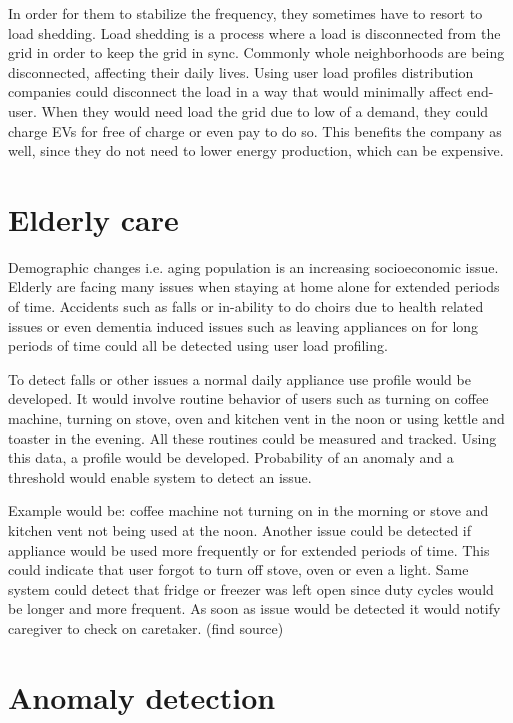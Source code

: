 \documentclass[
11pt, %
english, %
singlespacing, %
headsepline, %
]{MastersDoctoralThesis} %
\begin{document}
In order for them to stabilize the frequency, they sometimes have to resort to load shedding.
Load shedding is a process where a load is disconnected from the grid in order to keep the grid in sync.
Commonly whole neighborhoods are being disconnected, affecting their daily lives.
Using user load profiles distribution companies could disconnect the load in a way that would minimally affect end-user. 
When they would need load the grid due to low of a demand, they could charge EVs for free of charge or even pay to do so. 
This benefits the company as well, since they do not need to lower energy production, which can be expensive. 

\section{Elderly care}

Demographic changes i.e. aging population is an increasing socioeconomic issue.
Elderly are facing many issues when staying at home alone for extended periods of time.
Accidents such as falls or in-ability to do choirs due to health related issues or even dementia induced issues 
such as leaving appliances on for long periods of time could all be detected using user load profiling.

To detect falls or other issues a normal daily appliance use profile would be developed.
It would involve routine behavior of users such as turning on coffee machine, turning on stove, oven and kitchen vent in the noon or using kettle and toaster in the evening.
All these routines could be measured and tracked. Using this data, a profile would be developed.
Probability of an anomaly and a threshold would enable system to detect an issue.

Example would be: coffee machine not turning on in the morning or stove and kitchen vent not being used at the noon.
Another issue could be detected if appliance would be used more frequently or for extended periods of time. 
This could indicate that user forgot to turn off stove, oven or even a light. Same system could detect 
that fridge or freezer was left open since duty cycles would be longer and more frequent. 
As soon as issue would be detected it would notify caregiver to check on caretaker. (find source)

\section{Anomaly detection}
\end{document}
